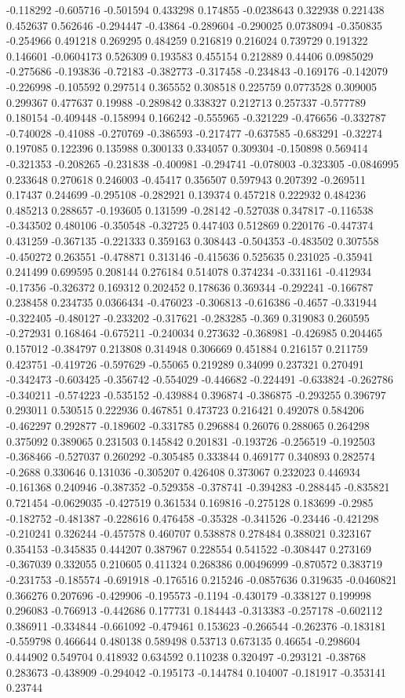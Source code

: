 -0.118292 -0.605716 -0.501594 0.433298 0.174855 -0.0238643 0.322938 0.221438 0.452637 0.562646 -0.294447 -0.43864 -0.289604 -0.290025 0.0738094 -0.350835 -0.254966 0.491218 0.269295 0.484259 0.216819 0.216024 0.739729 0.191322 0.146601 -0.0604173 0.526309 0.193583 0.455154 0.212889 0.44406 0.0985029 -0.275686 -0.193836 -0.72183 -0.382773 -0.317458 -0.234843 -0.169176 -0.142079 -0.226998 -0.105592 0.297514 0.365552 0.308518 0.225759 0.0773528 0.309005 0.299367 0.477637 0.19988 -0.289842 0.338327 0.212713 0.257337 -0.577789 0.180154 -0.409448 -0.158994 0.166242 -0.555965 -0.321229 -0.476656 -0.332787 -0.740028 -0.41088 -0.270769 -0.386593 -0.217477 -0.637585 -0.683291 -0.32274 0.197085 0.122396 0.135988 0.300133 0.334057 0.309304 -0.150898 0.569414 -0.321353 -0.208265 -0.231838 -0.400981 -0.294741 -0.078003 -0.323305 -0.0846995 0.233648 0.270618 0.246003 -0.45417 0.356507 0.597943 0.207392 -0.269511 0.17437 0.244699 -0.295108 -0.282921 0.139374 0.457218 0.222932 0.484236 0.485213 0.288657 -0.193605 0.131599 -0.28142 -0.527038 0.347817 -0.116538 -0.343502 0.480106 -0.350548 -0.32725 0.447403 0.512869 0.220176 -0.447374 0.431259 -0.367135 -0.221333 0.359163 0.308443 -0.504353 -0.483502 0.307558 -0.450272 0.263551 -0.478871 0.313146 -0.415636 0.525635 0.231025 -0.35941 0.241499 0.699595 0.208144 0.276184 0.514078 0.374234 -0.331161 -0.412934 -0.17356 -0.326372 0.169312 0.202452 0.178636 0.369344 -0.292241 -0.166787 0.238458 0.234735 0.0366434 -0.476023 -0.306813 -0.616386 -0.4657 -0.331944 -0.322405 -0.480127 -0.233202 -0.317621 -0.283285 -0.369 0.319083 0.260595 -0.272931 0.168464 -0.675211 -0.240034 0.273632 -0.368981 -0.426985 0.204465 0.157012 -0.384797 0.213808 0.314948 0.306669 0.451884 0.216157 0.211759 0.423751 -0.419726 -0.597629 -0.55065 0.219289 0.34099 0.237321 0.270491 -0.342473 -0.603425 -0.356742 -0.554029 -0.446682 -0.224491 -0.633824 -0.262786 -0.340211 -0.574223 -0.535152 -0.439884 0.396874 -0.386875 -0.293255 0.396797 0.293011 0.530515 0.222936 0.467851 0.473723 0.216421 0.492078 0.584206 -0.462297 0.292877 -0.189602 -0.331785 0.296884 0.26076 0.288065 0.264298 0.375092 0.389065 0.231503 0.145842 0.201831 -0.193726 -0.256519 -0.192503 -0.368466 -0.527037 0.260292 -0.305485 0.333844 0.469177 0.340893 0.282574 -0.2688 0.330646 0.131036 -0.305207 0.426408 0.373067 0.232023 0.446934 -0.161368 0.240946 -0.387352 -0.529358 -0.378741 -0.394283 -0.288445 -0.835821 0.721454 -0.0629035 -0.427519 0.361534 0.169816 -0.275128 0.183699 -0.2985 -0.182752 -0.481387 -0.228616 0.476458 -0.35328 -0.341526 -0.23446 -0.421298 -0.210241 0.326244 -0.457578 0.460707 0.538878 0.278484 0.388021 0.323167 0.354153 -0.345835 0.444207 0.387967 0.228554 0.541522 -0.308447 0.273169 -0.367039 0.332055 0.210605 0.411324 0.268386 0.00496999 -0.870572 0.383719 -0.231753 -0.185574 -0.691918 -0.176516 0.215246 -0.0857636 0.319635 -0.0460821 0.366276 0.207696 -0.429906 -0.195573 -0.1194 -0.430179 -0.338127 0.199998 0.296083 -0.766913 -0.442686 0.177731 0.184443 -0.313383 -0.257178 -0.602112 0.386911 -0.334844 -0.661092 -0.479461 0.153623 -0.266544 -0.262376 -0.183181 -0.559798 0.466644 0.480138 0.589498 0.53713 0.673135 0.46654 -0.298604 0.444902 0.549704 0.418932 0.634592 0.110238 0.320497 -0.293121 -0.38768 0.283673 -0.438909 -0.294042 -0.195173 -0.144784 0.104007 -0.181917 -0.353141 0.23744 